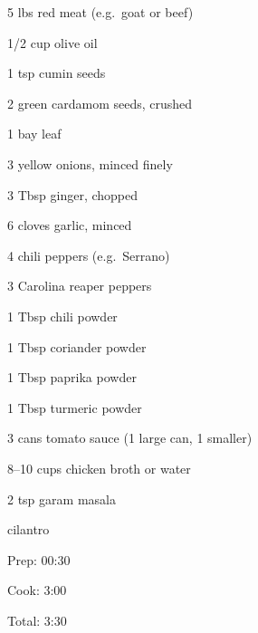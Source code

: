 \documentclass[oneside]{book}  %
\newcommand{\itemNL}{\item[] \hspace{-\labelsep}}  %
\begin{document}
\begin{IT}
  \begin{ingredients}
    \item[5 lbs] red meat (e.g.\ goat or beef)
    \item[1/2 cup] olive oil
    \item[1 tsp] cumin seeds
    \item[2] green cardamom seeds, crushed
    \item[1] bay leaf
    \item[3] yellow onions, minced finely
    \item[3 Tbsp] ginger, chopped
    \item[6] cloves garlic, minced
    \item[4] chili peppers (e.g.\ Serrano)
    \item[3] Carolina reaper peppers
    \item[1 Tbsp] chili powder
    \item[1 Tbsp] coriander powder
    \item[1 Tbsp] paprika powder
    \item[1 Tbsp] turmeric powder
    \item[3 cans] tomato sauce (1 large can, 1 smaller)
    \item[8--10 cups] chicken broth or water
    \item[2 tsp] garam masala
    \itemNL cilantro
  \end{ingredients}

  \switchcolumn

  \begin{timeline}
    \item[Prep:]  00:30
    \item[Cook:]  3:00
    \item[Total:] 3:30
  \end{timeline}
\end{IT}
\end{document}
